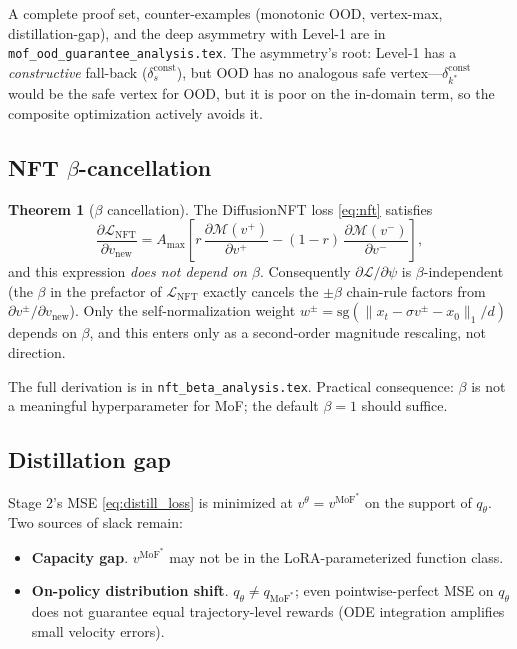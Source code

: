 \documentclass[11pt,a4paper]{article}
\newcommand{\loss}{\mathcal{L}}
\newcommand{\MoF}{\mathrm{MoF}}
\newcommand{\const}{\mathrm{const}}
\theoremstyle{definition}
\newtheorem{theorem}{Theorem}
\begin{document}
A complete proof set, counter-examples (monotonic OOD, vertex-max,
distillation-gap), and the deep asymmetry with Level-1 are in
\texttt{mof\_ood\_guarantee\_analysis.tex}. The asymmetry's root: Level-1
has a \emph{constructive} fall-back ($\delta_s^{\const}$), but OOD has
no analogous safe vertex---$\delta_{k^*}^{\const}$ would be the safe
vertex for OOD, but it is poor on the in-domain term, so the composite
optimization actively avoids it.

\subsection{NFT $\beta$-cancellation}
\label{ssec:beta_cancel}

\begin{theorem}[$\beta$ cancellation]
\label{thm:beta_cancel}
The DiffusionNFT loss \eqref{eq:nft} satisfies
\begin{equation}
\frac{\partial \loss_{\text{NFT}}}{\partial v_{\text{new}}}
= A_{\max}\!\left[
r\,\frac{\partial \mathcal{M}(v^+)}{\partial v^+}
- (1-r)\,\frac{\partial \mathcal{M}(v^-)}{\partial v^-}
\right],
\end{equation}
and this expression \emph{does not depend on $\beta$}. Consequently
$\partial\loss/\partial \psi$ is $\beta$-independent (the $\beta$ in the
prefactor of $\loss_{\text{NFT}}$ exactly cancels the $\pm\beta$ chain-rule
factors from $\partial v^\pm/\partial v_{\text{new}}$). Only the
self-normalization weight
$w^\pm = \mathrm{sg}(\|x_t-\sigma v^\pm-x_0\|_1/d)$ depends on $\beta$,
and this enters only as a second-order magnitude rescaling, not direction.
\end{theorem}

The full derivation is in \texttt{nft\_beta\_analysis.tex}. Practical
consequence: $\beta$ is not a meaningful hyperparameter for MoF; the
default $\beta=1$ should suffice.

\subsection{Distillation gap}
\label{ssec:distill_gap}

Stage 2's MSE \eqref{eq:distill_loss} is minimized at
$v^\theta=v^{\MoF^*}$ on the support of $q_\theta$. Two sources of slack
remain:

\begin{itemize}[leftmargin=1.5em]
\item \textbf{Capacity gap}. $v^{\MoF^*}$ may not be in the LoRA-parameterized
function class.
\item \textbf{On-policy distribution shift}. $q_\theta\neq q_{\MoF^*}$;
even pointwise-perfect MSE on $q_\theta$ does not guarantee equal
trajectory-level rewards (ODE integration amplifies small velocity
errors).
\end{itemize}
\end{document}
